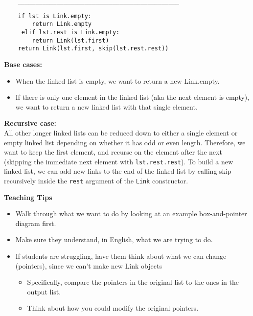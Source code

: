 \begin{parts}
\begin{blocksection}
\begin{lstlisting}
    ______________________________________________
\end{lstlisting}
\begin{solution}[0in]
\begin{lstlisting}
    if lst is Link.empty:
    	return Link.empty
     elif lst.rest is Link.empty:
        return Link(lst.first)
    return Link(lst.first, skip(lst.rest.rest))
\end{lstlisting}
\textbf{Base cases:}
\begin{itemize}
\item When the linked list is empty, we want to return a new Link.empty.
\item If there is only one element in the linked list (aka the next element is empty), we want to return a new linked list with that single element.
\end{itemize}
\textbf{Recursive case:} \\
All other longer linked lists can be reduced down to either a single element or empty linked list depending on whether it has odd or even length. Therefore, we want to keep the first element, and recurse on the element after the next (skipping the immediate next element with \lstinline{lst.rest.rest}). To build a new linked list, we can add new links to the end of the linked list by calling skip recursively inside the \lstinline{rest} argument of the \lstinline{Link} constructor.
\end{solution}
\end{blocksection}
\begin{questionmeta}
\textbf{Teaching Tips}
\begin{itemize}
    \item Walk through what we want to do by looking at an example box-and-pointer diagram first.
    \item Make sure they understand, in English, what we are trying to do.
    \item If students are struggling, have them think about what we can change (pointers), since we can't make new Link objects
    \begin{itemize}
        \item Specifically, compare the pointers in the original list to the ones in the output list.
        \item Think about how you could modify the original pointers.
    \end{itemize}
\end{itemize}
\end{questionmeta}


\end{parts}
